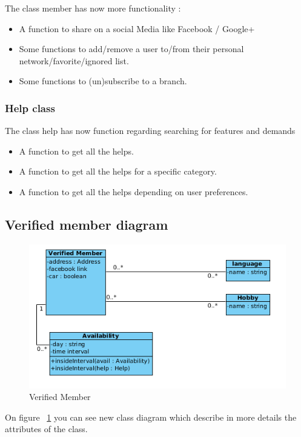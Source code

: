 \documentclass[11pt, a4paper]{article}   	%
\begin{document}
The class member has now more functionality :
\begin{itemize}
\item A function to share on a social Media like Facebook / Google+
\item Some functions to add/remove a user to/from their personal network/favorite/ignored list.
\item Some functions to (un)subscribe to a branch.
\end{itemize}

\subsubsection{Help class}

The class help has now function regarding searching for features and demands
\begin{itemize}
\item A function to get all the helps.
\item A function to get all the helps for a specific category.
\item A function to get all the helps depending on user preferences.
\end{itemize}

\subsection{Verified member diagram}

\begin{figure}[!ht]
   \includegraphics[width=\textwidth]{verifiedMember.png}
   \caption{\label{verifiedMember} Verified Member}
\end{figure}

On figure ~\ref{verifiedMember} you can see new class diagram which describe in more details the attributes of the class.
\end{document}
